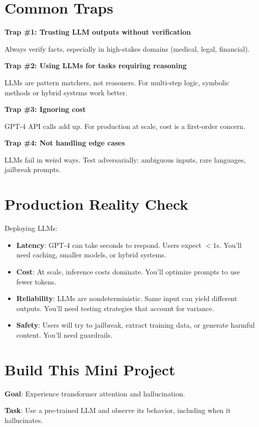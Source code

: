 \documentclass[11pt,oneside]{book}
\begin{document}
\section{Common Traps}

\textbf{Trap \#1: Trusting LLM outputs without verification}

Always verify facts, especially in high-stakes domains (medical, legal, financial).

\textbf{Trap \#2: Using LLMs for tasks requiring reasoning}

LLMs are pattern matchers, not reasoners. For multi-step logic, symbolic methods or hybrid systems work better.

\textbf{Trap \#3: Ignoring cost}

GPT-4 API calls add up. For production at scale, cost is a first-order concern.

\textbf{Trap \#4: Not handling edge cases}

LLMs fail in weird ways. Test adversarially: ambiguous inputs, rare languages, jailbreak prompts.

\section{Production Reality Check}

Deploying LLMs:

\begin{itemize}
\item \textbf{Latency}: GPT-4 can take seconds to respond. Users expect $<1$s. You'll need caching, smaller models, or hybrid systems.
\item \textbf{Cost}: At scale, inference costs dominate. You'll optimize prompts to use fewer tokens.
\item \textbf{Reliability}: LLMs are nondeterministic. Same input can yield different outputs. You'll need testing strategies that account for variance.
\item \textbf{Safety}: Users will try to jailbreak, extract training data, or generate harmful content. You'll need guardrails.
\end{itemize}

\section{Build This Mini Project}

\textbf{Goal}: Experience transformer attention and hallucination.

\textbf{Task}: Use a pre-trained LLM and observe its behavior, including when it hallucinates.
\end{document}
